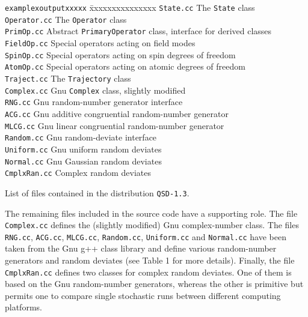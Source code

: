 \begin{table}
\begin{tabbing}
{\tt examplexoutputxxxxx} \= xxxxxxxxxxxxxxx \kill
{\tt State.cc} \> The {\tt State} class \\
{\tt Operator.cc} \> The {\tt Operator} class \\
{\tt PrimOp.cc} \> Abstract {\tt PrimaryOperator} class, 
                   interface for derived classes \\
{\tt FieldOp.cc} \> Special operators acting on field modes \\
{\tt SpinOp.cc} \> Special operators acting on spin degrees of freedom \\
{\tt AtomOp.cc} \> Special operators acting on atomic degrees of freedom \\
{\tt Traject.cc} \> The {\tt Trajectory} class \\
{\tt Complex.cc} \> Gnu {\tt Complex} class, slightly modified \\
{\tt RNG.cc} \> Gnu random-number generator interface \\
{\tt ACG.cc} \> Gnu additive congruential random-number generator \\
{\tt MLCG.cc} \> Gnu linear congruential random-number generator \\
{\tt Random.cc} \> Gnu random-deviate interface \\
{\tt Uniform.cc} \> Gnu uniform random deviates \\
{\tt Normal.cc} \> Gnu Gaussian random deviates \\
{\tt CmplxRan.cc} \> Complex random deviates \\
\end{tabbing}

\caption{List of files contained in the distribution {\tt QSD-1.3}.}
\end{table}

The remaining files included in the source code have a supporting role. The
file {\tt Complex.cc} defines the (slightly modified) Gnu complex-number
class. The files {\tt RNG.cc}, {\tt ACG.cc}, {\tt MLCG.cc}, {\tt Random.cc},
{\tt Uniform.cc} and {\tt Normal.cc} have been taken from the Gnu g++ class
library and define various random-number generators and random deviates (see
Table 1 for more details). Finally, the file {\tt CmplxRan.cc} defines two
classes for complex random deviates. One of them is based on the Gnu
random-number generators, 
whereas the other is primitive
but permits one to compare single stochastic runs between
different computing platforms.

